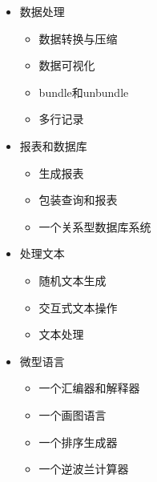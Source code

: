 \documentclass[bigger]{beamer}
\begin{document}
\begin{frame}[fragile]
\begin{itemize}
\item 数据处理
\label{sec-5-1-4}%
\begin{itemize}

\item 数据转换与压缩
\label{sec-5-1-4-1}%

\item 数据可视化
\label{sec-5-1-4-2}%

\item bundle和unbundle
\label{sec-5-1-4-3}%

\item 多行记录
\label{sec-5-1-4-4}%
\end{itemize} %

\item 报表和数据库
\label{sec-5-1-5}%
\begin{itemize}

\item 生成报表
\label{sec-5-1-5-1}%

\item 包装查询和报表
\label{sec-5-1-5-2}%

\item 一个关系型数据库系统
\label{sec-5-1-5-3}%
\end{itemize} %

\item 处理文本
\label{sec-5-1-6}%
\begin{itemize}

\item 随机文本生成
\label{sec-5-1-6-1}%

\item 交互式文本操作
\label{sec-5-1-6-2}%

\item 文本处理
\label{sec-5-1-6-3}%
\end{itemize} %

\item 微型语言
\label{sec-5-1-7}%
\begin{itemize}

\item 一个汇编器和解释器
\label{sec-5-1-7-1}%

\item 一个画图语言
\label{sec-5-1-7-2}%

\item 一个排序生成器
\label{sec-5-1-7-3}%

\item 一个逆波兰计算器
\label{sec-5-1-7-4}%


\end{itemize}
\end{itemize}
\end{frame}
\end{document}
